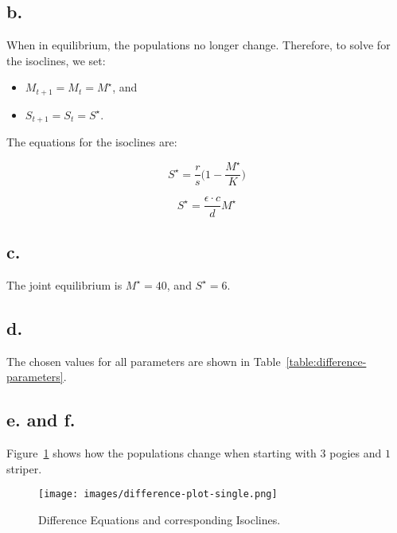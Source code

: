 \newpage
\subsection*{b.}

When in equilibrium, the populations no longer change.
Therefore, to solve for the isoclines, we set:
\begin{itemize}
    \item $M_{t + 1} = M_t = M^{\star}$, and
    \item $S_{t + 1} = S_t = S^{\star}$.
\end{itemize}

The equations for the isoclines are:

\begin{equation}
    \label{equation:difference:m-isocline}
    S^{\star} = \frac{r}{s} \bigg( 1 - \frac{M^{\star}}{K} \bigg)
\end{equation}

\begin{equation}
    \label{equation:difference:s-isocline}
    S^{\star} = \frac{\epsilon \cdot c}{d} M^{\star}
\end{equation}


\subsection*{c.}

The joint equilibrium is $M^{\star} = 40$, and $S^{\star} = 6$.


\subsection*{d.}

The chosen values for all parameters are shown in Table~\ref{table:difference-parameters}.


\subsection*{e. and f.}

Figure~\ref{figure:difference-single} shows how the populations change when starting with $3$ pogies and $1$ striper.

\begin{figure}[ht!]
    \centering
    \texttt{[image: images/difference-plot-single.png]}
    \caption{Difference Equations and corresponding Isoclines.}
    \label{figure:difference-single}
\end{figure}

